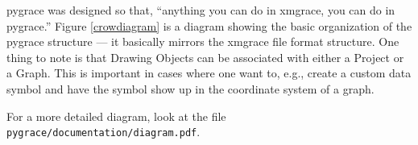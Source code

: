 pygrace was designed so that, ``anything you can do in xmgrace, you can
do in pygrace.''  Figure \ref{crowdiagram} is a diagram showing the
basic organization of the pygrace structure --- it basically mirrors
the xmgrace file format structure.  One thing to note is that Drawing
Objects can be associated with either a Project or a Graph.  This is
important in cases where one want to, e.g., create a custom data
symbol and have the symbol show up in the coordinate system of a
graph.

\noindent
For a more detailed diagram, look at the file {\tt
  pygrace/documentation/diagram.pdf}.
